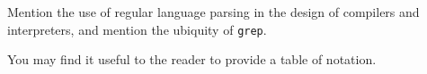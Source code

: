 \documentclass{bcthesis}
\begin{document}
	\begin{remark}
		Mention the use of regular language parsing in the design of compilers and interpreters, and mention the ubiquity of \texttt{grep}.
	\end{remark}




%
\label{ch:mathematical-notation}

You may find it useful to the reader to provide a table of notation. 

\label{ch:conclusion}





\backmatter

\nocite{*}


\end{document}
